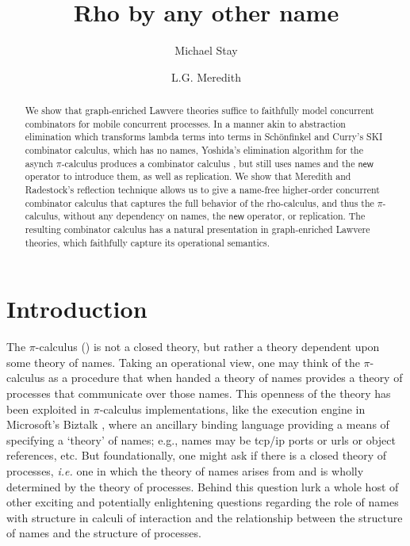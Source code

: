 \documentclass{llncs}
\title{Rho by any other name}
\author{
Michael Stay\inst{1}\\
\and
L.G. Meredith\inst{2}\\
}
\institute{
  {Pyrofex Corp.}\\
  \email{\fontsize{8}{8}\selectfont stay@pyrofex.net}\\
  \and
  {RChain Cooperative}\\
  \email{\fontsize{8}{8}\selectfont greg@rchain.coop}
}
\newcommand{\pic}{$\pi$-calculus}
\begin{document}
\maketitle
\begin{abstract}
\noindent
  We show that graph-enriched Lawvere theories suffice to faithfully
  model concurrent combinators for mobile concurrent processes. In a
  manner akin to abstraction elimination which transforms lambda terms
  into terms in Schönfinkel and Curry's SKI combinator calculus, which
  has no names, Yoshida's elimination algorithm for the asynch \pic
  produces a combinator calculus \cite{DBLP:journals/tcs/Yoshida02},
  but still uses names and the $\mathsf{new}$ operator to introduce
  them, as well as replication.  We show that Meredith and Radestock's
  reflection technique \cite{DBLP:journals/entcs/MeredithR05} allows
  us to give a name-free higher-order concurrent combinator calculus
  that captures the full behavior of the rho-calculus, and thus the
  \pic, without any dependency on names, the $\mathsf{new}$ operator,
  or replication. The resulting combinator calculus has a natural
  presentation in graph-enriched Lawvere theories, which faithfully
  capture its operational semantics.

\end{abstract}

\section{Introduction}
  
  The {\pic} (\cite{milner91polyadicpi}) is not a closed theory, but
rather a theory dependent upon some theory of names. Taking an
operational view, one may think of the {\pic} as a procedure that when
handed a theory of names provides a theory of processes that
communicate over those names. This openness of the theory has been
exploited in {\pic} implementations, like the execution engine in
Microsoft's Biztalk \cite{biztalk}, where an ancillary binding
language providing a means of specifying a `theory' of names; e.g.,
names may be tcp/ip ports or urls or object references, etc. But
foundationally, one might ask if there is a closed theory of
processes, {\em i.e.} one in which the theory of names arises from and is
wholly determined by the theory of processes. Behind this question
lurk a whole host of other exciting and potentially enlightening
questions regarding the role of names with structure in calculi of
interaction and the relationship between the structure of names and
the structure of processes.
\end{document}
